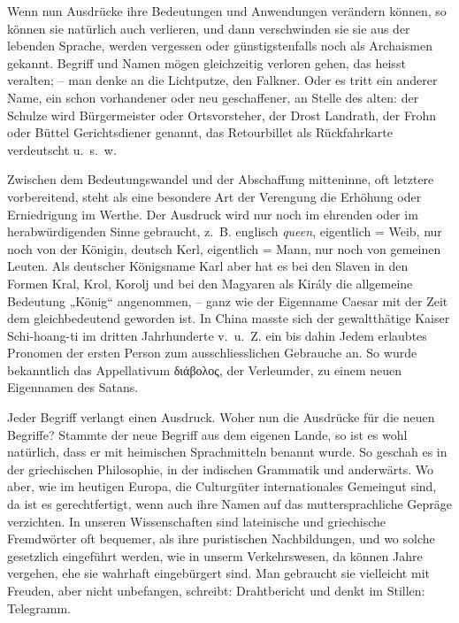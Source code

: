 {Wenn nun Ausdrücke ihre Bedeutungen und Anwendungen verändern können, so können sie natürlich auch verlieren, und dann verschwinden sie sie aus der lebenden Sprache, werden vergessen oder günstigstenfalls noch als Archaismen gekannt. Begriff und Namen mögen gleichzeitig verloren gehen, das heisst veralten; – man denke an die Lichtputze, den Falkner. Oder es tritt ein anderer Name, ein schon vorhandener oder neu geschaffener, an Stelle des alten: der Schulze wird Bürgermeister oder Ortsvorsteher, der Drost Landrath, der Frohn oder Büttel Gerichtsdiener genannt, das Retourbillet als Rückfahrkarte verdeutscht u.~s.~w. 

Zwischen dem Bedeutungswandel und der Abschaffung mitteninne, oft letztere vorbereitend, steht als eine besondere Art der Verengung die Erhöhung oder Erniedrigung im Werthe. Der Ausdruck wird nur noch im ehrenden oder im herabwürdigenden Sinne gebraucht, z.~B. englisch \label{fp.228} \textit{queen}, eigentlich = Weib, nur noch von der Königin, deutsch Kerl, eigentlich = Mann, nur noch von gemeinen Leuten. Als deutscher Königsname Karl aber hat es bei den Slaven in den Formen Kral, Krol, Korolj und bei den Magyaren als Király die allgemeine Bedeutung „König“ angenommen, – ganz wie der Eigenname Caesar mit der Zeit dem  gleichbedeutend geworden ist. In China masste sich der gewalt\-thätige Kaiser Schi-hoang-ti im dritten Jahrhunderte v.~u.~Z. ein bis dahin Jedem erlaubtes Pronomen der ersten Person zum ausschliesslichen Gebrauche an. So wurde bekanntlich das Appellativum διάβολος, der Verleumder, zu einem neuen Eigennamen des Satans.

Jeder Begriff verlangt einen Ausdruck. Woher nun die Ausdrücke für die neuen Begriffe? Stammte der neue Begriff aus dem eigenen Lande, so ist es wohl natürlich, dass er mit heimischen Sprachmitteln benannt wurde. So geschah es in der griechischen Philosophie, in der indischen Grammatik und anderwärts. Wo aber, wie im heutigen Europa, die Culturgüter internationales Gemeingut sind, da ist es gerechtfertigt, wenn auch ihre Namen auf das muttersprachliche Gepräge verzichten. In unseren Wissenschaften sind lateinische und griechische Fremdwörter oft bequemer, als ihre puristischen Nachbildungen, und wo solche gesetzlich eingeführt werden, wie in unserm Verkehrswesen, da können Jahre vergehen, ehe sie wahrhaft eingebürgert sind. Man gebraucht sie vielleicht mit Freuden, aber nicht unbefangen, schreibt: Drahtbericht und denkt im Stillen: Tele\-gramm.

}
